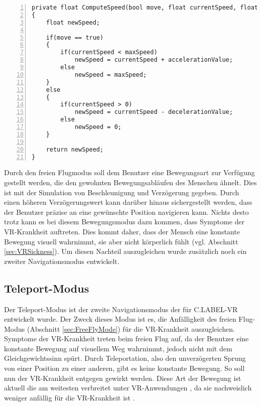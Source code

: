 \begin{lstlisting}[caption={Vereinfachte Implementierung des Beschleunigungs- und Verzögerungsprinzip in eine einzelne Richtung}, captionpos=t, numbers=left, label=lst:FreeFly]
private float ComputeSpeed(bool move, float currentSpeed, float maxSpeed ,float accelerationValue, float decelerationValue)
{
	float newSpeed;	
	
	if(move == true)
	{
		if(currentSpeed < maxSpeed)
			newSpeed = currentSpeed + accelerationValue;
		else
			newSpeed = maxSpeed;
	}
	else
	{
		if(currentSpeed > 0)
			newSpeed = currentSpeed - decelerationValue;
		else
			newSpeed = 0;
	}
	
	return newSpeed;
}
\end{lstlisting}
\quad

Durch den freien Flugmodus soll dem Benutzer eine Bewegungsart zur Verfügung gestellt werden, die den gewohnten Bewegungsabläufen des Menschen ähnelt. Dies ist mit der Simulation von Beschleunigung und Verzögerung gegeben. Durch einen höheren Verzögerungswert kann darüber hinaus sichergestellt werden, dass der Benutzer präzise an eine gewünschte Position navigieren kann. Nichts desto trotz kann es bei diesem Bewegungsmodus dazu kommen, dass Symptome der VR-Krankheit auftreten. Dies kommt daher, dass der Mensch eine konstante Bewegung visuell wahrnimmt, sie aber nicht körperlich fühlt (vgl. Abschnitt \ref{sec:VRSickness}). Um diesen Nachteil auszugleichen wurde zusätzlich noch ein zweiter Navigationsmodus entwickelt.
 
\subsection{Teleport-Modus}
\label{sec:TeleportMode}

Der Teleport-Modus ist der zweite Navigationsmodus der für C.LABEL-VR entwickelt wurde. Der Zweck dieses Modus ist es, die Anfälligkeit des freien Flug-Modus (Abschnitt \ref{sec:FreeFlyMode}) für die VR-Krankheit auszugleichen. Symptome der VR-Krankheit treten beim freien Flug auf, da der Benutzer eine konstante Bewegung auf visuellem Weg wahrnimmt, jedoch nicht mit dem Gleichgewichtssinn spürt. Durch Teleportation, also den unverzögerten Sprung von einer Position zu einer anderen, gibt es keine konstante Bewegung. So soll nun der VR-Krankheit entgegen gewirkt werden. Diese Art der Bewegung ist aktuell die am weitesten verbreitet unter VR-Anwendungen \cite{bib:VRLocomotionReview}, da sie nachweislich weniger anfällig für die VR-Krankheit ist \cite{bib:PointTeleport}.\\

